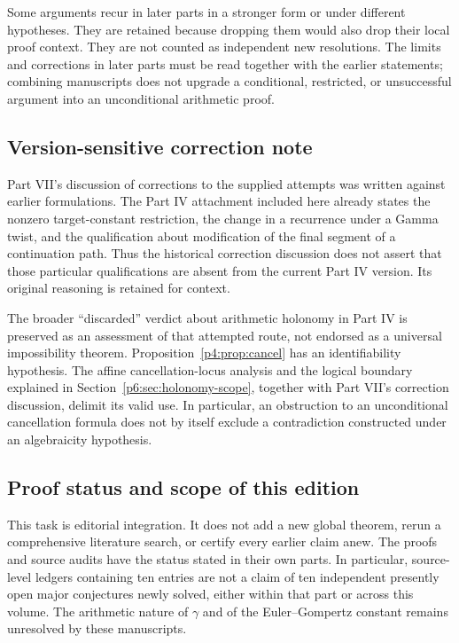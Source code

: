 \documentclass[11pt,a4paper]{article}
\theoremstyle{definition}
\theoremstyle{remark}
\numberwithin{equation}{section}
\renewcommand{\thesection}{\Roman{part}.\arabic{section}}
\renewcommand{\theHsection}{\arabic{part}.main.\arabic{section}}
\begin{document}
Some arguments recur in later parts in a stronger form or under different
hypotheses. They are retained because dropping them would also drop their
local proof context. They are not counted as independent new resolutions.
The limits and corrections in later parts must be read together with the
earlier statements; combining manuscripts does not upgrade a conditional,
restricted, or unsuccessful argument into an unconditional arithmetic proof.

\subsection*{Version-sensitive correction note}
Part VII's discussion of corrections to the supplied attempts was written
against earlier formulations. The Part IV attachment included here already
states the nonzero target-constant restriction, the change in a recurrence
under a Gamma twist, and the qualification about modification of the final
segment of a continuation path. Thus the historical correction discussion
does not assert that those particular qualifications are absent from the
current Part IV version. Its original reasoning is retained for context.

The broader ``discarded'' verdict about arithmetic holonomy in Part IV is
preserved as an assessment of that attempted route, not endorsed as a
universal impossibility theorem. Proposition~\ref{p4:prop:cancel} has an
identifiability hypothesis. The affine cancellation-locus analysis and
the logical boundary explained in Section~\ref{p6:sec:holonomy-scope},
together with Part VII's correction discussion, delimit its valid use.
In particular, an obstruction to an unconditional cancellation formula
does not by itself exclude a contradiction constructed under an
algebraicity hypothesis.

\subsection*{Proof status and scope of this edition}
This task is editorial integration. It does not add a new global theorem,
rerun a comprehensive literature search, or certify every earlier claim
anew. The proofs and source audits have the status stated in their own parts.
In particular, source-level ledgers containing ten entries are not a claim
of ten independent presently open major conjectures newly solved, either
within that part or across this volume. The arithmetic nature of
$\gamma$ and of the Euler--Gompertz constant remains unresolved by these
manuscripts.
\clearpage
\tableofcontents
\clearpage
\clearpage
\setcounter{section}{0}\setcounter{subsection}{0}
\renewcommand{\thesection}{\Roman{part}.\arabic{section}}
\renewcommand{\theHsection}{\arabic{part}.main.\arabic{section}}
\renewcommand{\refname}{References for Part I}
\end{document}
